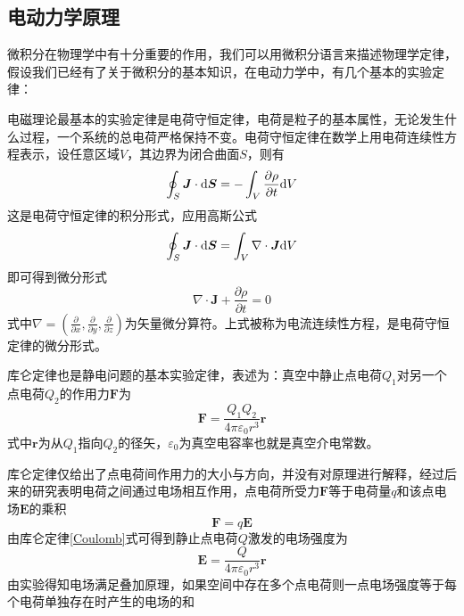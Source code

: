 \documentclass[UTF8,a4paper,10pt]{ctexart}
\begin{document}
\begin{multicols}{2}
        \subsection{电动力学原理}
        微积分在物理学中有十分重要的作用，我们可以用微积分语言来描述物理学定律，假设我们已经有了关于微积分的基本知识，在电动力学中，有几个基本的实验定律：\par
        电磁理论最基本的实验定律是电荷守恒定律，电荷是粒子的基本属性，无论发生什么过程，一个系统的总电荷严格保持不变。电荷守恒定律在数学上用电荷连续性方程表示，设任意区域$V$，其边界为闭合曲面$S$，则有
        \begin{equation}
            \oint_S\bm{J}\cdot {\rm d}\bm{S} = -\int_V\frac{\partial\rho}{\partial t}{\rm d}V
        \end{equation}
        这是电荷守恒定律的积分形式，应用高斯公式
        \begin{equation*}
            \oint_S\bm{J}\cdot {\rm d}\bm{S} = \int_V\nabla\cdot\bm{J}{\rm d}V
        \end{equation*}
        即可得到微分形式
        \begin{equation}\label{continuity equation}
            \nabla\cdot\bm{J} + \frac{\partial\rho}{\partial t}= 0
        \end{equation}
        式中$\nabla = (\frac{\partial}{\partial x},\frac{\partial}{\partial y},\frac{\partial}{\partial z})$为矢量微分算符。上式被称为电流连续性方程，是电荷守恒定律的微分形式。\par
        库仑定律也是静电问题的基本实验定律，表述为：真空中静止点电荷$Q_1$对另一个点电荷$Q_2$的作用力$\bm{F}$为
        \begin{equation}\label{Coulomb}
            \bm{F} = \frac{Q_1Q_2}{4\pi\varepsilon_0r^3}\bm{r}
        \end{equation}
        式中$\bm{r}$为从$Q_1$指向$Q_2$的径矢，$\varepsilon_0$为真空电容率也就是真空介电常数。\par
        库仑定律仅给出了点电荷间作用力的大小与方向，并没有对原理进行解释，经过后来的研究表明电荷之间通过电场相互作用，点电荷所受力$\bm{F}$等于电荷量$q$和该点电场$\bm{E}$的乘积
        \begin{equation}
            \bm{F} = q\bm{E}
        \end{equation}
        由库仑定律\eqref{Coulomb}式可得到静止点电荷$Q$激发的电场强度为
        \begin{equation}
            \bm{E} = \frac{Q}{4\pi\varepsilon_0r^3}\bm{r}
        \end{equation}
        由实验得知电场满足叠加原理，如果空间中存在多个点电荷则一点电场强度等于每个电荷单独存在时产生的电场的和

\end{multicols}
\end{document}
